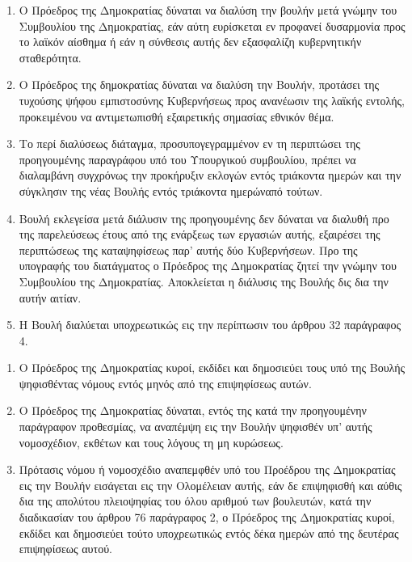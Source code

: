 \documentclass[twoside, a4paper, 10pt]{article}
\begin{document}
\begin{multicols}{2}
\begin{enumerate}
\begin{BigQuote}
\begin{enumerate}
  \item[1.] Ο Πρόεδρος της Δημοκρατίας δύναται να διαλύση την βουλήν μετά γνώμην του Συμβουλίου της Δημοκρατίας, εάν αύτη ευρίσκεται εν προφανεί δυσαρμονία προς το λαϊκόν αίσθημα ή εάν η σύνθεσις αυτής δεν εξασφαλίζη κυβερνητικήν σταθερότητα.
  \item[2.] Ο Πρόεδρος της δημοκρατίας δύναται να διαλύση την Βουλήν, προτάσει της τυχούσης ψήφου εμπιστοσύνης Κυβερνήσεως προς ανανέωσιν της λαϊκής εντολής, προκειμένου να αντιμετωπισθή εξαιρετικής σημασίας εθνικόν θέμα.
  \item[3.] Το περί διαλύσεως διάταγμα, προσυπογεγραμμένον εν τη περιπτώσει της προηγουμένης παραγράφου υπό του Υπουργικού συμβουλίου, πρέπει να διαλαμβάνη συγχρόνως την προκήρυξιν εκλογών εντός τριάκοντα ημερών και την σύγκλησιν της νέας Βουλής εντός τριάκοντα ημερώναπό τούτων.
  \item[4.] Βουλή εκλεγείσα μετά διάλυσιν της προηγουμένης δεν δύναται να διαλυθή προ της παρελεύσεως έτους από της ενάρξεως των εργασιών αυτής, εξαιρέσει της περιπτώσεως της καταψηφίσεως παρ' αυτής δύο Κυβερνήσεων. Προ της υπογραφής του διατάγματος ο Πρόεδρος της Δημοκρατίας ζητεί την γνώμην του Συμβουλίου της Δημοκρατίας. Αποκλείεται η διάλυσις της Βουλής δις δια την αυτήν αιτίαν.
  \item[5.] Η Βουλή διαλύεται υποχρεωτικώς εις την περίπτωσιν του άρθρου 32 παράγραφος 4.
\end{enumerate}

\begin{enumerate}
  \item[1.] Ο Πρόεδρος της Δημοκρατίας κυροί, εκδίδει και δημοσιεύει τους υπό της Βουλής ψηφισθέντας νόμους εντός μηνός από της επιψηφίσεως αυτών.
  \item[2.] Ο Πρόεδρος της Δημοκρατίας δύναται, εντός της κατά την προηγουμένην παράγραφον προθεσμίας, να αναπέμψη εις την Βουλήν ψηφισθέν υπ' αυτής νομοσχέδιον, εκθέτων και τους λόγους τη μη κυρώσεως.
  \item[3.] Πρότασις νόμου ή νομοσχέδιο αναπεμφθέν υπό του Προέδρου της Δημοκρατίας εις την Βουλήν εισάγεται εις την Ολομέλειαν αυτής, εάν δε επιψηφισθή και αύθις δια της απολύτου πλειοψηφίας του όλου αριθμού των βουλευτών, κατά την διαδικασίαν του άρθρου 76 παράγραφος 2, ο Πρόεδρος της Δημοκρατίας κυροί, εκδίδει και δημοσιεύει τούτο υποχρεωτικώς εντός δέκα ημερών από της δευτέρας επιψηφίσεως αυτού.
\end{enumerate}


\end{BigQuote}
\end{enumerate}
\end{multicols}
\end{document}
